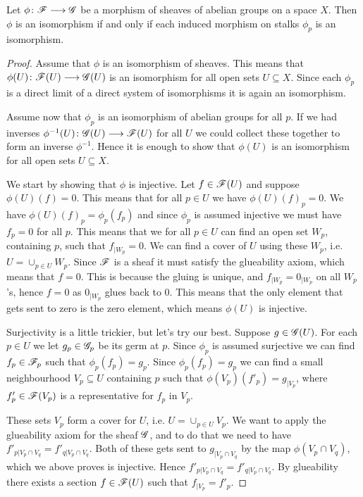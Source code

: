 \begin{proposition}
Let $\phi\colon\mathscr{F}\longrightarrow\mathscr{G}$ be a morphism of sheaves of abelian groups on a space $X$. Then $\phi$ is an isomorphism if and only if each induced morphism on stalks $\phi_p$ is an isomorphism. 
\end{proposition}
\begin{proof}
Assume that $\phi$ is an isomorphism of sheaves. This means that $\phi(U)\colon\mathscr{F}(U)\longrightarrow\mathscr{G}(U)$ is an isomorphism for all open sets $U\subseteq X$. Since each $\phi_p$ is a direct limit of a direct system of isomorphisms it is again an isomorphism. 

Assume now that $\phi_p$ is an isomorphism of abelian groups for all $p$. If we had inverses $\phi^{-1}(U)\colon\mathscr{G}(U)\longrightarrow\mathscr{F}(U)$ for all $U$ we could collect these together to form an inverse $\phi^{-1}$. Hence it is enough to show that $\phi(U)$ is an isomorphism for all open sets $U\subseteq X$. 

We start by showing that $\phi$ is injective. Let $f\in \mathscr{F}(U)$ and suppose $\phi(U)(f)=0$. This means that for all $p\in U$ we have $\phi(U)(f)_p=0$. We have $\phi(U)(f)_p = \phi_p(f_p)$ and since $\phi_p$ is assumed injective we must have $f_p=0$ for all $p$. This means that we for all $p\in U$ can find an open set $W_p$, containing $p$, such that $f_{\vert W_p} = 0$. We can find a cover of $U$ using these $W_p$, i.e. $U=\cup_{p\in U}W_p$. Since $\mathscr{F}$ is a sheaf it must satisfy the glueability axiom, which means that $f=0$. This is because the gluing is unique, and $f_{\vert W_p} = 0_{\vert W_p}$ on all $W_p$'s, hence $f=0$ as $0_{\vert W_p}$ glues back to $0$. This means that the only element that gets sent to zero is the zero element, which means $\phi(U)$ is injective. 

Surjectivity is a little trickier, but let's try our best. Suppose $g\in \mathscr{G}(U)$. For each $p\in U$ we let $g_p\in \mathscr{G}_p$ be its germ at $p$. Since $\phi_p$ is assumed surjective we can find $f_p\in \mathscr{F}_p$ such that $\phi_p(f_p)=g_p$. Since $\phi_p(f_p)=g_p$ we can find a small neighbourhood $V_p\subseteq U$ containing $p$ such that $\phi(V_p)(f'_p)=g_{\vert V_p}$, where $f'_p\in \mathscr{F}(V_p)$ is a representative for $f_p$ in $V_p$. 

These sets $V_p$ form a cover for $U$, i.e. $U=\cup_{p\in U}V_p$. We want to apply the glueability axiom for the sheaf $\mathscr{G}$, and to do that we need to have $f'_{p\vert V_p\cap V_q} = f'_{q\vert V_p\cap V_q}$. Both of these gets sent to $g_{\vert V_p\cap V_q}$ by the map $\phi(V_p\cap V_q)$, which we above proves is injective. Hence $f'_{p\vert V_p\cap V_q} = f'_{q\vert V_p\cap V_q}$. By glueability there exists a section $f\in \mathscr{F}(U)$ such that $f_{\vert V_p}=f'_p$. 


\end{proof}
